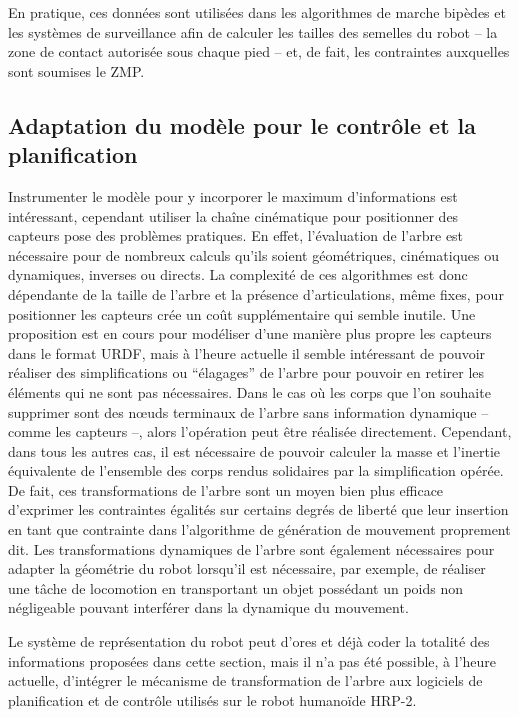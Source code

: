 En pratique, ces données sont utilisées dans les algorithmes de marche
bipèdes et les systèmes de surveillance afin de calculer les tailles
des semelles du robot -- la zone de contact autorisée sous chaque pied
-- et, de fait, les contraintes auxquelles sont soumises le ZMP.


\subsection{Adaptation du modèle pour le contrôle et la planification}

Instrumenter le modèle pour y incorporer le maximum d'informations est
intéressant, cependant utiliser la chaîne cinématique pour positionner
des capteurs pose des problèmes pratiques. En effet, l'évaluation de
l'arbre est nécessaire pour de nombreux calculs qu'ils soient
géométriques, cinématiques ou dynamiques, inverses ou directs. La
complexité de ces algorithmes est donc dépendante de la taille de
l'arbre et la présence d'articulations, même fixes, pour positionner
les capteurs crée un coût supplémentaire qui semble inutile. Une
proposition est en cours pour modéliser d'une manière plus propre les
capteurs dans le format URDF, mais à l'heure actuelle il semble
intéressant de pouvoir réaliser des simplifications ou ``élagages'' de
l'arbre pour pouvoir en retirer les éléments qui ne sont pas
nécessaires. Dans le cas où les corps que l'on souhaite supprimer sont
des n\oe uds terminaux de l'arbre sans information dynamique -- comme
les capteurs --, alors l'opération peut être réalisée
directement. Cependant, dans tous les autres cas, il est nécessaire de
pouvoir calculer la masse et l'inertie équivalente de l'ensemble des
corps rendus solidaires par la simplification opérée. De fait, ces
transformations de l'arbre sont un moyen bien plus efficace d'exprimer
les contraintes égalités sur certains degrés de liberté que leur
insertion en tant que contrainte dans l'algorithme de génération de
mouvement proprement dit. Les transformations dynamiques de l'arbre
sont également nécessaires pour adapter la géométrie du robot
lorsqu'il est nécessaire, par exemple, de réaliser une tâche de
locomotion en transportant un objet possédant un poids non négligeable
pouvant interférer dans la dynamique du mouvement.

Le système de représentation du robot peut d'ores et déjà coder la
totalité des informations proposées dans cette section, mais il n'a
pas été possible, à l'heure actuelle, d'intégrer le mécanisme de
transformation de l'arbre aux logiciels de planification et de
contrôle utilisés sur le robot humanoïde HRP-2.


